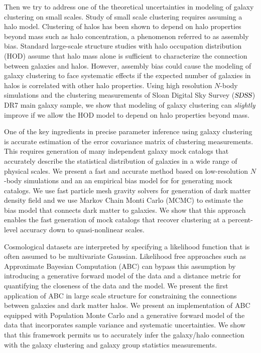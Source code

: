 Then we try to address one of the theoretical uncertainties in modeling of galaxy clustering on small scales. Study of small scale clustering requires assuming a halo model. Clustering of halos has been shown to depend on halo properties beyond mass such as halo concentration, a phenomenon referred to as assembly bias. Standard large-scale structure studies with halo occupation distribution (HOD) assume that halo mass alone is sufficient to characterize the connection between galaxies and halos. However, assembly bias could cause the modeling of galaxy clustering to face systematic effects if the expected number of galaxies in halos is correlated with other halo properties. Using high resolution $N$-body simulations and the clustering measurements of Sloan Digital Sky Survey ($\textsl{SDSS}$) DR7 main galaxy sample, we show that modeling of galaxy clustering can \emph{slightly} improve if we allow the HOD model to depend on halo properties beyond mass.

One of the key ingredients in precise parameter inference using galaxy clustering is accurate estimation of the error covariance matrix of clustering measurements. This requires generation of many independent galaxy mock catalogs that accurately describe the statistical distribution of galaxies in a wide range of physical scales. We present a fast and accurate method based on low-resolution $N$-body simulations and an an empirical bias model for for generating mock catalogs. We use fast particle mesh gravity solvers for generation of dark matter density field and we use Markov Chain Monti Carlo (MCMC) to estimate the bias model that connects dark matter to galaxies. We show that this approach enables the fast generation of mock catalogs that recover clustering at a percent-level accuracy down to quasi-nonlinear scales. 

Cosmological datasets are interpreted by specifying a likelihood function that is often assumed to be multivariate Gaussian. Likelihood free approaches such as Approximate Bayesian Computation (ABC) can bypass this assumption by introducing a generative forward model of the data and a distance metric for quantifying the closeness of the data and the model. We present the first application of ABC in large scale structure for constraining the connections between galaxies and dark matter halos. 
We present an implementation of ABC equipped with Population Monte Carlo and a generative forward model of the data that incorporates sample variance and systematic uncertainties.
We show that this framework permits us to accurately infer the galaxy/halo connection with the galaxy clustering and galaxy group statistics measurements.  
